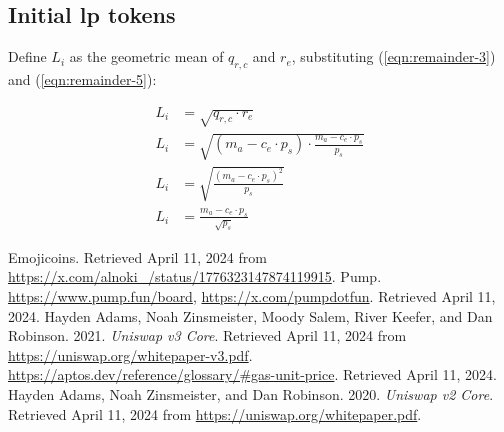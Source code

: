 \documentclass[table, twocolumn]{article}
\begin{document}
\subsection{Initial \gls*{lp} tokens} \label{sec:initial-lp-tokens}

Define $L_i$ as the geometric mean of $q_{r, c}$ and $r_e$, substituting
(\ref{eqn:remainder-3}) and (\ref{eqn:remainder-5}):

\begin{align}
  L_i & = \sqrt{q_{r, c} \cdot r_e} \nonumber                                  \\
  L_i & =
  \sqrt{(m_a - c_e \cdot p_s) \cdot \frac{m_a - c_e \cdot p_s}{p_s}} \nonumber \\
  L_i & = \sqrt{\frac{(m_a - c_e \cdot p_s) ^ 2}{p_s}} \nonumber               \\
  L_i & =\frac{m_a - c_e \cdot p_s}{\sqrt{p_s}}\end{align}

\begin{thebibliography}{}
   Emojicoins. Retrieved April 11, 2024 from
  \url{https://x.com/alnoki_/status/1776323147874119915}.
   Pump. \url{https://www.pump.fun/board}, \url{https://x.com/pumpdotfun}.
  Retrieved April 11, 2024.
   Hayden Adams, Noah Zinsmeister, Moody Salem, River Keefer, and Dan
  Robinson. 2021. \emph{Uniswap v3 Core}. Retrieved April 11, 2024 from
  \url{https://uniswap.org/whitepaper-v3.pdf}.
   \url{https://aptos.dev/reference/glossary/#gas-unit-price}. Retrieved
  April 11, 2024.
   Hayden Adams, Noah Zinsmeister, and Dan Robinson. 2020. \emph{Uniswap
    v2 Core}. Retrieved April 11, 2024 from \url{https://uniswap.org/whitepaper.pdf}.
\end{thebibliography}
\end{document}
